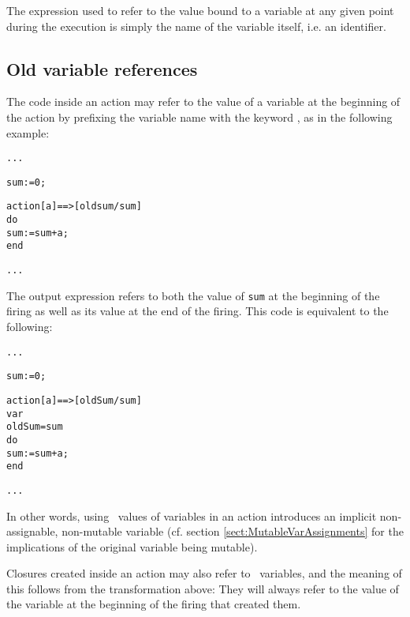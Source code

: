 The expression used to refer to the value bound to a variable at any
given point during the execution is simply the name of the variable
itself, i.e. an identifier. 

\subsection{Old variable references}\label{sect:OldVarRefs}



The code inside an action may
refer to the value of a variable at the beginning of the action by
prefixing the variable name with the keyword \kwOld, as in the
following example:

\begin{example}
\begin{alltt}
  ...

  sum := 0;

  action [a] ==> [old sum / sum] 
  do
    sum := sum + a;
  end

  ...
\end{alltt}
\end{example}


The output expression refers to both the value of {\tt sum} at the
beginning of the firing as well as its value at the end of the
firing. This code is equivalent to the following:

\begin{alltt}
  ...

  sum := 0;

  action [a] ==> [oldSum / sum] 
  var 
    oldSum = sum 
  do
    sum := sum + a;
  end
  
  ...
\end{alltt}

In other words, using \kwOld~values of variables in an action
introduces an implicit non-assignable, non-mutable variable
(cf. section \ref{sect:MutableVarAssignments} for the implications of
the original variable being mutable).

Closures created inside an action may also refer to \kwOld~variables,
and the meaning of this follows from the transformation above: They
will always refer to the value of the variable at the beginning of
the firing that created them. 


